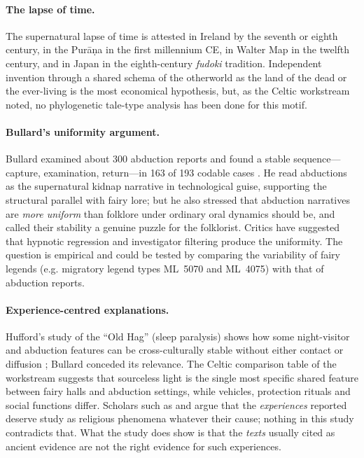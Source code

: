 \documentclass[11pt,a4paper]{article}
\begin{document}
\paragraph{The lapse of time.} The supernatural lapse of time is attested in Ireland by the seventh or eighth century, in the Purāṇa in the first millennium CE, in Walter Map in the twelfth century, and in Japan in the eighth-century \emph{fudoki} tradition. Independent invention through a shared schema of the otherworld as the land of the dead or the ever-living is the most economical hypothesis, but, as the Celtic workstream noted, no phylogenetic tale-type analysis has been done for this motif.

\paragraph{Bullard's uniformity argument.} Bullard examined about 300 abduction reports and found a stable sequence---capture, examination, return---in 163 of 193 codable cases \parencite{bullard1987,bullard1989}. He read abductions as the supernatural kidnap narrative in technological guise, supporting the structural parallel with fairy lore; but he also stressed that abduction narratives are \emph{more uniform} than folklore under ordinary oral dynamics should be, and called their stability a genuine puzzle for the folklorist. Critics have suggested that hypnotic regression and investigator filtering produce the uniformity. The question is empirical and could be tested by comparing the variability of fairy legends (e.g. migratory legend types ML~5070 and ML~4075) with that of abduction reports.

\paragraph{Experience-centred explanations.} Hufford's study of the ``Old Hag'' (sleep paralysis) shows how some night-visitor and abduction features can be cross-culturally stable without either contact or diffusion \parencite{hufford1982}; Bullard conceded its relevance. The Celtic comparison table of the workstream suggests that sourceless light is the single most specific shared feature between fairy halls and abduction settings, while vehicles, protection rituals and social functions differ. Scholars such as \textcite{kripal2010authors} and \textcite{pasulka2019cosmic} argue that the \emph{experiences} reported deserve study as religious phenomena whatever their cause; nothing in this study contradicts that. What the study does show is that the \emph{texts} usually cited as ancient evidence are not the right evidence for such experiences.
\end{document}
